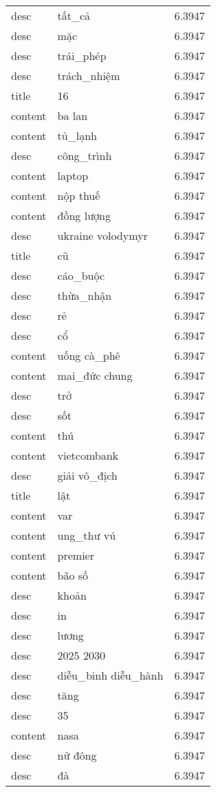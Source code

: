 \documentclass{article}
\begin{document}
\begin{tabular}{lll}
desc & tất\_cả & 6.3947\\
desc & mặc & 6.3947\\
desc & trái\_phép & 6.3947\\
desc & trách\_nhiệm & 6.3947\\
title & 16 & 6.3947\\
content & ba lan & 6.3947\\
content & tủ\_lạnh & 6.3947\\
desc & công\_trình & 6.3947\\
content & laptop & 6.3947\\
content & nộp thuế & 6.3947\\
content & đồng lượng & 6.3947\\
desc & ukraine volodymyr & 6.3947\\
title & cũ & 6.3947\\
desc & cáo\_buộc & 6.3947\\
desc & thừa\_nhận & 6.3947\\
desc & rẻ & 6.3947\\
desc & cổ & 6.3947\\
content & uống cà\_phê & 6.3947\\
content & mai\_đức chung & 6.3947\\
desc & trở & 6.3947\\
desc & sốt & 6.3947\\
content & thú & 6.3947\\
content & vietcombank & 6.3947\\
desc & giải vô\_địch & 6.3947\\
title & lật & 6.3947\\
content & var & 6.3947\\
content & ung\_thư vú & 6.3947\\
content & premier & 6.3947\\
content & bão số & 6.3947\\
desc & khoản & 6.3947\\
desc & in & 6.3947\\
desc & lương & 6.3947\\
desc & 2025 2030 & 6.3947\\
desc & diễu\_binh diễu\_hành & 6.3947\\
desc & tăng & 6.3947\\
desc & 35 & 6.3947\\
content & nasa & 6.3947\\
desc & nữ đông & 6.3947\\
desc & đà & 6.3947\\

\end{tabular}
\end{document}

